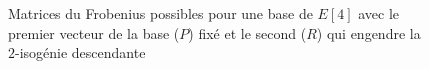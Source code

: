 \documentclass[10pt,a4paper]{beamer}
\theoremstyle{plain}
\theoremstyle{definition}
\theoremstyle{definition}
\theoremstyle{definition}
\theoremstyle{definition}
\theoremstyle{remark}
\theoremstyle{remark}
\begin{document}
\begin{frame}
\begin{figure}
\begin{center}
\end{center}

\caption{\label{fig:elk:dif:niv:mat} Matrices du Frobenius possibles pour une base de $E[4]$ avec le premier vecteur de la base ($P$) fixé et le second ($R$) qui engendre la $2$-isogénie descendante}
\end{figure}

\end{frame}

\end{document}
